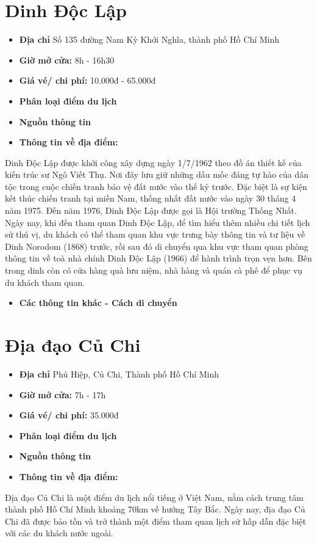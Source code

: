 \documentclass{article}
\begin{document}
\section{Dinh Độc Lập}
\begin{itemize}
    \item{\textbf{Địa chỉ}} Số 135 đường Nam Kỳ Khởi Nghĩa, thành phố Hồ Chí Minh
    \item{\textbf{Giờ mở cửa:}} 8h - 16h30
    \item{\textbf{Giá vé/ chi phí:}} 10.000đ - 65.000đ
    \item{\textbf{Phân loại điểm du lịch} }
    \item{\textbf{Nguồn thông tin}}
    \item{\textbf{Thông tin về địa điểm:}}
\end{itemize}
Dinh Độc Lập được khởi công xây dựng ngày 1/7/1962 theo đồ án thiết kế của kiến trúc sư Ngô Viết Thụ. Nơi đây lưu giữ những dấu mốc đáng tự hào của dân tộc trong cuộc chiến tranh bảo vệ đất nước vào thế kỷ trước. Đặc biệt là sự kiện kết thúc chiến tranh tại miền Nam, thống nhất đất nước vào ngày 30 tháng 4 năm 1975. Đến năm 1976, Dinh Độc Lập được gọi là Hội trường Thống Nhất. Ngày nay, khi đến tham quan Dinh Độc Lập, để tìm hiểu thêm nhiều chi tiết lịch sử thú vị, du khách có thể tham quan khu vực trưng bày thông tin và tư liệu về Dinh Norodom (1868) trước, rồi sau đó di chuyển qua khu vực tham quan phòng thông tin về toà nhà chính Dinh Độc Lập (1966) để hành trình trọn vẹn hơn. Bên trong dinh còn có cửa hàng quà lưu niệm, nhà hàng và quán cà phê để phục vụ du khách tham quan.
\begin{itemize}
    \item{\textbf{Các thông tin khác - Cách di chuyển}}
\end{itemize}

\section{Địa đạo Củ Chi}
\begin{itemize}
    \item{\textbf{Địa chỉ}} Phú Hiệp, Củ Chi, Thành phố Hồ Chí Minh
    \item{\textbf{Giờ mở cửa:}} 7h - 17h
    \item{\textbf{Giá vé/ chi phí:}} 35.000đ
    \item{\textbf{Phân loại điểm du lịch} }
    \item{\textbf{Nguồn thông tin}}
    \item{\textbf{Thông tin về địa điểm:}}
\end{itemize}
Địa đạo Củ Chi là một điểm du lịch nổi tiếng ở Việt Nam, nằm cách trung tâm thành phố Hồ Chí Minh khoảng 70km về hướng Tây Bắc. Ngày nay, địa đạo Củ Chi đã được bảo tồn và trở thành một điểm tham quan lịch sử hấp dẫn đặc biệt với các du khách nước ngoài.
\end{document}
